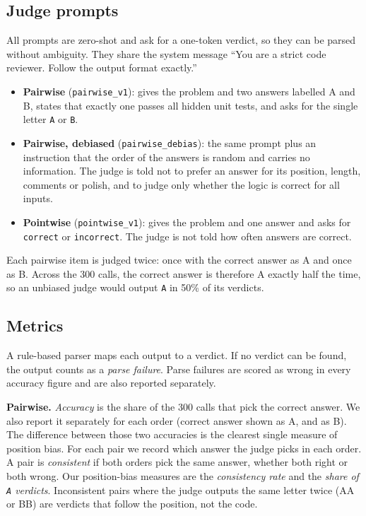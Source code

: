 \subsection{Judge prompts}
\label{sec:prompts}

All prompts are zero-shot and ask for a one-token verdict, so they can be parsed without ambiguity. They share
the system message ``You are a strict code reviewer. Follow the output format exactly.''

\begin{itemize}
\item \textbf{Pairwise} (\texttt{pairwise\_v1}): gives the problem and two answers labelled A and B, states
that exactly one passes all hidden unit tests, and asks for the single letter \texttt{A} or \texttt{B}.
\item \textbf{Pairwise, debiased} (\texttt{pairwise\_debias}): the same prompt plus an instruction that the
order of the answers is random and carries no information. The judge is told not to prefer an answer for
its position, length, comments or polish, and to judge only whether the logic is correct for all inputs.
\item \textbf{Pointwise} (\texttt{pointwise\_v1}): gives the problem and one answer and asks for
\texttt{correct} or \texttt{incorrect}. The judge is not told how often answers are correct.
\end{itemize}

Each pairwise item is judged twice: once with the correct answer as A and once as B. Across the 300 calls,
the correct answer is therefore A exactly half the time, so an unbiased judge would output \texttt{A} in
50\% of its verdicts.

\subsection{Metrics}
\label{sec:metrics}

A rule-based parser maps each output to a verdict. If no verdict can be found, the output counts as a
\emph{parse failure}. Parse failures are scored as wrong in every accuracy figure and are also reported
separately.

\textbf{Pairwise.} \emph{Accuracy} is the share of the 300 calls that pick the correct answer. We also
report it separately for each order (correct answer shown as A, and as B). The difference between those two
accuracies is the clearest single measure of position bias. For each pair we record which answer the judge
picks in each order. A pair is \emph{consistent} if both orders pick the same answer, whether both right or
both wrong. Our position-bias measures are the \emph{consistency rate} and the \emph{share of \texttt{A}
verdicts}. Inconsistent pairs where the judge outputs the same letter twice (AA or BB) are verdicts that
follow the position, not the code.

